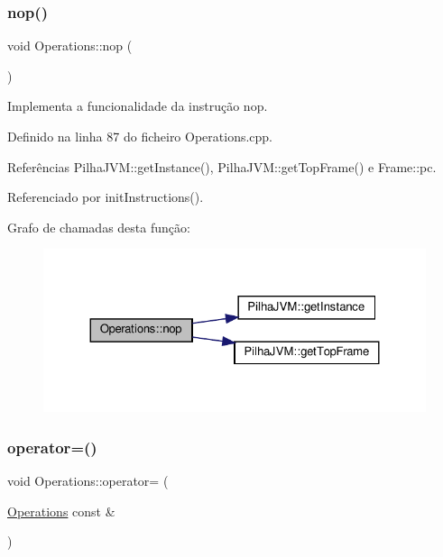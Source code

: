 \subsubsection{\texorpdfstring{nop()}{nop()}}
{\footnotesize\ttfamily void Operations\+::nop (\begin{DoxyParamCaption}{ }\end{DoxyParamCaption})\hspace{0.3cm}{\ttfamily [private]}}



Implementa a funcionalidade da instrução nop. 



Definido na linha 87 do ficheiro Operations.\+cpp.



Referências Pilha\+J\+V\+M\+::get\+Instance(), Pilha\+J\+V\+M\+::get\+Top\+Frame() e Frame\+::pc.



Referenciado por init\+Instructions().

Grafo de chamadas desta função\+:
\nopagebreak
\begin{figure}[H]
\begin{center}
\leavevmode
\includegraphics[width=324pt]{classOperations_a3426eecc1b88f11cc8317f99d430a201_cgraph}
\end{center}
\end{figure}
\mbox{\label{classOperations_ab6deca5423e5767c3fffef4e5107b627}} 
\subsubsection{\texorpdfstring{operator=()}{operator=()}}
{\footnotesize\ttfamily void Operations\+::operator= (\begin{DoxyParamCaption}\item[{\hyperlink{classOperations}{Operations} const \&}]{ }\end{DoxyParamCaption})\hspace{0.3cm}{\ttfamily [private]}}

